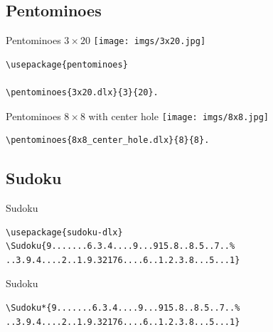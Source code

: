\documentclass{beamer}
\begin{document}
\subsection{Pentominoes}

%

%
\begin{frame}[fragile]{Pentominoes $3\times20$}
\centering\texttt{[image: imgs/3x20.jpg]}
\begin{verbatim}
\usepackage{pentominoes}

\pentominoes{3x20.dlx}{3}{20}.
\end{verbatim}  
\end{frame}

%
\begin{frame}[fragile]{Pentominoes $8\times8$ with center hole}
\centering\texttt{[image: imgs/8x8.jpg]}
\begin{verbatim}
\pentominoes{8x8_center_hole.dlx}{8}{8}.
\end{verbatim}  
\end{frame}

\subsection{Sudoku}

%
\begin{frame}[fragile]{Sudoku}
\begin{verbatim}
\usepackage{sudoku-dlx}
\Sudoku{9.......6.3.4....9...915.8..8.5..7..%
..3.9.4....2..1.9.32176....6..1.2.3.8...5...1}
\end{verbatim}  

\begin{center}
\end{center}
\end{frame}

%
\begin{frame}[fragile]{Sudoku}
\begin{verbatim}
\Sudoku*{9.......6.3.4....9...915.8..8.5..7..%
..3.9.4....2..1.9.32176....6..1.2.3.8...5...1}
\end{verbatim}

\begin{center}
\end{center}
\end{frame}
\end{document}
